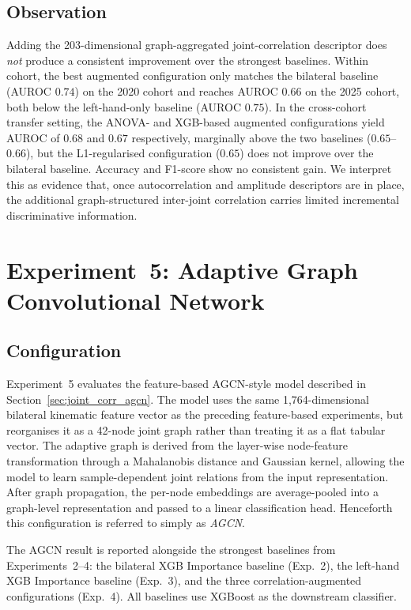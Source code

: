 \subsection{Observation}

Adding the 203-dimensional graph-aggregated joint-correlation descriptor does \emph{not} produce a consistent improvement over the strongest baselines. Within cohort, the best augmented configuration only matches the bilateral baseline (AUROC $0.74$) on the 2020 cohort and reaches AUROC $0.66$ on the 2025 cohort, both below the left-hand-only baseline (AUROC $0.75$). In the cross-cohort transfer setting, the ANOVA- and XGB-based augmented configurations yield AUROC of $0.68$ and $0.67$ respectively, marginally above the two baselines ($0.65$--$0.66$), but the L1-regularised configuration ($0.65$) does not improve over the bilateral baseline. Accuracy and F1-score show no consistent gain. We interpret this as evidence that, once autocorrelation and amplitude descriptors are in place, the additional graph-structured inter-joint correlation carries limited incremental discriminative information.

\section{Experiment~5: Adaptive Graph Convolutional Network}
\label{sec:exp5}

\subsection{Configuration}

Experiment~5 evaluates the feature-based AGCN-style model described in Section~\ref{sec:joint_corr_agcn}. The model uses the same 1,764-dimensional bilateral kinematic feature vector as the preceding feature-based experiments, but reorganises it as a 42-node joint graph rather than treating it as a flat tabular vector. The adaptive graph is derived from the layer-wise node-feature transformation through a Mahalanobis distance and Gaussian kernel, allowing the model to learn sample-dependent joint relations from the input representation. After graph propagation, the per-node embeddings are average-pooled into a graph-level representation and passed to a linear classification head. Henceforth this configuration is referred to simply as \emph{AGCN}.

The AGCN result is reported alongside the strongest baselines from Experiments~2--4: the bilateral XGB Importance baseline (Exp.~2), the left-hand XGB Importance baseline (Exp.~3), and the three correlation-augmented configurations (Exp.~4). All baselines use XGBoost as the downstream classifier.

